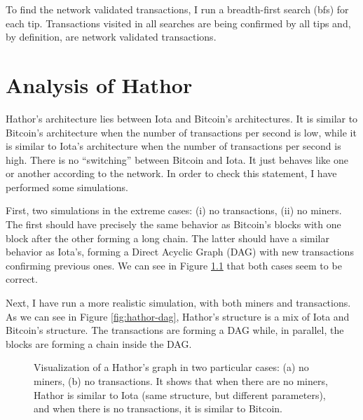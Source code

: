 To find the network validated transactions, I run a breadth-first search (bfs) for each tip. Transactions visited in all searches are being confirmed by all tips and, by definition, are network validated transactions.



\chapter{Analysis of Hathor}


Hathor's architecture lies between Iota and Bitcoin's architectures. It is similar to Bitcoin's architecture when the number of transactions per second is low, while it is similar to Iota's architecture when the number of transactions per second is high. There is no ``switching'' between Bitcoin and Iota. It just behaves like one or another according to the network. In order to check this statement, I have performed some simulations.

First, two simulations in the extreme cases: (i) no transactions, (ii) no miners. The first should have precisely the same behavior as Bitcoin's blocks with one block after the other forming a long chain. The latter should have a similar behavior as Iota's, forming a Direct Acyclic Graph (DAG) with new transactions confirming previous ones. We can see in Figure \ref{fig:hathor-similarities} that both cases seem to be correct.

Next, I have run a more realistic simulation, with both miners and transactions. As we can see in Figure \ref{fig:hathor-dag}, Hathor's structure is a mix of Iota and Bitcoin's structure. The transactions are forming a DAG while, in parallel, the blocks are forming a chain inside the DAG.

\begin{figure}[!htb]
\centering
{}
\caption{Visualization of a Hathor's graph in two particular cases: (a) no miners, (b) no transactions. It shows that when there are no miners, Hathor is similar to Iota (same structure, but different parameters), and when there is no transactions, it is similar to Bitcoin.\label{fig:hathor-similarities}}
\end{figure}

